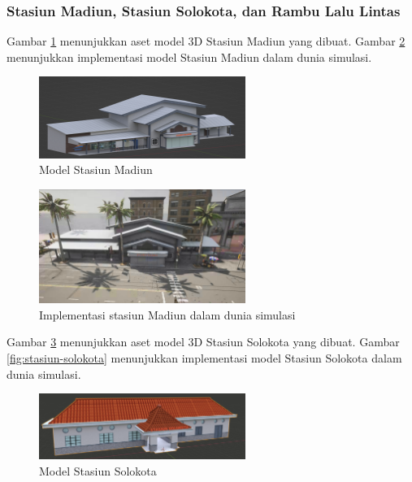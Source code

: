 \subsubsection{Stasiun Madiun, Stasiun Solokota, dan Rambu Lalu Lintas}

Gambar \ref{fig:stasiun-madiun-model} menunjukkan aset model 3D Stasiun Madiun
yang dibuat. Gambar \ref{fig:stasiun-madiun} menunjukkan implementasi model
Stasiun Madiun dalam dunia simulasi.

\begin{figure}[!h]
    \centering
    \includegraphics[width=0.6\textwidth]{resources/chapter-3-stasiun-madiun-model.png}
    \caption{Model Stasiun Madiun}
    \label{fig:stasiun-madiun-model}
\end{figure}

\begin{figure}[!h]
    \centering
    \includegraphics[width=0.6\textwidth]{resources/chapter-4/stasiun-madiun-carla.png}
    \caption{Implementasi stasiun Madiun dalam dunia simulasi}
    \label{fig:stasiun-madiun}
\end{figure}

Gambar \ref{fig:stasiun-solokota-model} menunjukkan aset model 3D Stasiun
Solokota yang dibuat. Gambar \ref{fig:stasiun-solokota} menunjukkan implementasi
model Stasiun Solokota dalam dunia simulasi.

\begin{figure}[!h]
    \centering
    \includegraphics[width=0.6\textwidth]{resources/chapter-3-stasiun-solokota-model.png}
    \caption{Model Stasiun Solokota}
    \label{fig:stasiun-solokota-model}
\end{figure}

